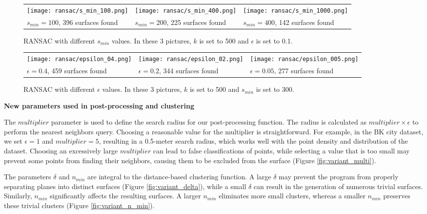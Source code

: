 \documentclass[a4paper,9pt]{article}
\begin{document}
\begin{figure}[H]
    \begin{tabularx}{\textwidth}{XXX}
        \texttt{[image: ransac/s\_min\_100.png]} & 
        \texttt{[image: ransac/s\_min\_400.png]} & 
        \texttt{[image: ransac/s\_min\_1000.png]} \\
        $s_{min} = 100$, 396 surfaces found & $s_{min} = 200$, 225 surfaces found & $s_{min} = 400$, 142 surfaces found
    \end{tabularx}
    \caption{RANSAC with different $s_{min}$ values. In these 3 pictures, $k$ is set to 500 and $\epsilon$ is set to 0.1.}
    \label{fig:variant_smin}
\end{figure}

\begin{figure}[H]
    \begin{tabularx}{\textwidth}{XXX}
        \texttt{[image: ransac/epsilon\_04.png]} & 
        \texttt{[image: ransac/epsilon\_02.png]} & 
        \texttt{[image: ransac/epsilon\_005.png]} \\
        $\epsilon = 0.4$, 459 surfaces found & $\epsilon = 0.2$, 344 surfaces found & $\epsilon = 0.05$, 277 surfaces found
    \end{tabularx}
    \caption{RANSAC with different $\epsilon$ values. In these 3 pictures, $k$ is set to 500 and $s_{min}$ is set to 300.}
    \label{fig:variant_epsilon}
\end{figure}

\textbf{New parameters used in post-processing and clustering}
\par
The $multiplier$ parameter is used to define the search radius for our post-processing function. The radius is calculated as $multiplier \times \epsilon$ to perform the nearest neighbors query. Choosing a reasonable value for the multiplier is straightforward. For example, in the BK city dataset, we set $\epsilon = 1$ and $multiplier = 5$, resulting in a 0.5-meter search radius, which works well with the point density and distribution of the dataset. 
Choosing an excessively large $multiplier$ can lead to false classifications of points, while selecting a value that is too small may prevent some points from finding their neighbors, causing them to be excluded from the surface (Figure \ref{fig:variant_multi}).
\\\par
The parameters $\delta$ and $n_{min}$ are integral to the distance-based clustering function. A large $\delta$ may prevent the program from properly separating planes into distinct surfaces (Figure \ref{fig:variant_delta}), while a small $\delta$ can result in the generation of numerous trivial surfaces. Similarly, $n_{min}$ significantly affects the resulting surfaces. A larger $n_{min}$ eliminates more small clusters, whereas a smaller $n_{min}$ preserves these trivial clusters (Figure \ref{fig:variant_n_min}).
\end{document}
